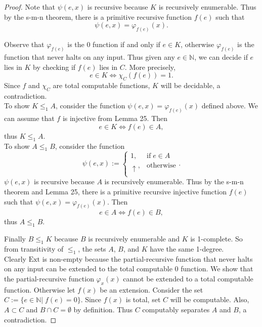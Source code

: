 \documentclass{article}
\begin{document}
\begin{enumerate}[label={\bf Q\arabic*:}]
\begin{proof}
      Note that $\psi(e,x)$ is recursive because $K$ is recursively
      enumerable. Thus by the s-m-n theorem, there is a primitive
      recursive function $f(e)$ such that
      \[\psi(e,x)=\varphi_{f(e)}(x).\]

      Observe that $\varphi_{f(e)}$ is the 0 function if and only if $e\in
      K$, otherwise $\varphi_{f(e)}$ is the function that never halts on
      any input. Thus given any $e\in\mathbb{N}$, we can decide if $e$ lies
      in $K$ by checking if $f(e)$ lies in $C$. More precisely,
      \[e\in K \Leftrightarrow \chi_C(f(e))=1.\]
      Since $f$ and $\chi_C$ are total computable functions, $K$ will be
      decidable, a contradiction. \\

      To show $K\leq_1A$, consider the function
      $\psi(e,x)=\varphi_{f(e)}(x)$ defined above. We can assume that $f$
      is injective from Lemma 25. Then
      \[e\in K \Leftrightarrow f(e)\in A,\]
      thus $K\leq_1A$. \\

      To show $A\leq_1B$, consider the function
      \begin{equation*}
        \psi(e,x) :=
        \begin{cases}
          1, &\text{if}\; e\in A\\
          \uparrow, &\text{otherwise}\\
        \end{cases}.
      \end{equation*}
      $\psi(e,x)$ is recursive because $A$ is recursively enumerable. Thus
      by the s-m-n theorem and Lemma 25, there is a primitive recursive
      injective function $f(e)$ such that $\psi(e,x)=\varphi_{f(e)}(x)$.
      Then
      \[e\in A \Leftrightarrow f(e)\in B,\]
      thus $A\leq_1B$.

      Finally $B\leq_1K$ because $B$ is recursively enumerable and $K$ is
      1-complete. So from transitivity of $\leq_1$, the sets $A$, $B$, and
      $K$ have the same 1-degree. \\

      Clearly $\text{Ext}$ is non-empty because the partial-recursive
      function that never halts on any input can be extended to the
      total computable 0 function. We show that the partial-recursive
      function $\varphi_x(x)$ cannot be extended to a total computable
      function. Otherwise let $f(x)$ be an extension. Consider the set
      $C:=\{e\in\mathbb{N}|\; f(e)=0\}$. Since $f(x)$ is total, set $C$
      will be computable. Also, $A\subset C$ and $B\cap C=\emptyset$ by
      definition. Thus $C$ computably separates $A$ and $B$, a
      contradiction.
    \end{proof}


\end{enumerate}
\end{document}

